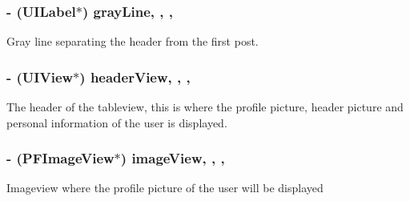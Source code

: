\subsubsection[{gray\+Line}]{\setlength{\rightskip}{0pt plus 5cm}-\/ (U\+I\+Label$\ast$) gray\+Line\hspace{0.3cm}{\ttfamily [read]}, {\ttfamily [write]}, {\ttfamily [nonatomic]}, {\ttfamily [strong]}}\label{interface_e_s_account_view_controller_acada7b03b8f32038376047f77f3e5896}
Gray line separating the header from the first post. \hypertarget{interface_e_s_account_view_controller_a2d504efdc18c9ce1f2fc5970499f21c4}{}
\subsubsection[{header\+View}]{\setlength{\rightskip}{0pt plus 5cm}-\/ (U\+I\+View$\ast$) header\+View\hspace{0.3cm}{\ttfamily [read]}, {\ttfamily [write]}, {\ttfamily [nonatomic]}, {\ttfamily [strong]}}\label{interface_e_s_account_view_controller_a2d504efdc18c9ce1f2fc5970499f21c4}
The header of the tableview, this is where the profile picture, header picture and personal information of the user is displayed. \hypertarget{interface_e_s_account_view_controller_a836df84e12dabfe7a53a87c382271b04}{}
\subsubsection[{image\+View}]{\setlength{\rightskip}{0pt plus 5cm}-\/ (P\+F\+Image\+View$\ast$) image\+View\hspace{0.3cm}{\ttfamily [read]}, {\ttfamily [write]}, {\ttfamily [nonatomic]}, {\ttfamily [strong]}}\label{interface_e_s_account_view_controller_a836df84e12dabfe7a53a87c382271b04}
Imageview where the profile picture of the user will be displayed \hypertarget{interface_e_s_account_view_controller_a82b57173e362024e4bcc76e91ab0d18c}{}
